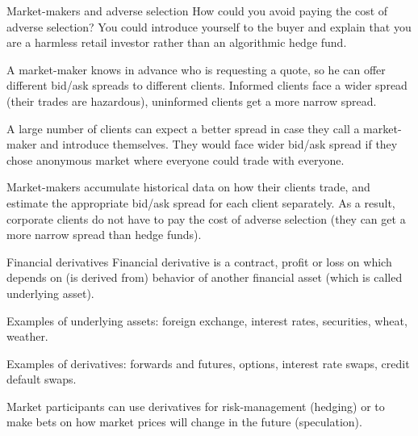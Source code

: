 \documentclass{beamer}
\begin{document}
\begin{frame}{Market-makers and adverse selection}
\justify
How could you avoid paying the cost of adverse selection? You could introduce yourself to the buyer and explain that you are a 
harmless retail investor rather than an algorithmic hedge fund.

\justify
A market-maker knows in advance \alert{who} is requesting a quote, so he can offer different bid/ask spreads to different clients.
Informed clients face a wider spread (their trades are hazardous), uninformed clients get a more narrow spread.

\justify
A large number of clients can expect a better spread in case they call a market-maker and introduce themselves. They would face wider bid/ask spread if they chose anonymous market where everyone could trade with everyone.

\justify
Market-makers accumulate historical data on how their clients trade, and estimate the appropriate bid/ask spread for each client separately. As a result, corporate clients do not have to pay the cost of adverse selection (they can get a more narrow spread than hedge funds).
\end{frame}



\begin{frame}{Financial derivatives}
\justify
\alert{Financial derivative} is a contract, profit or loss on which depends on (is derived from) behavior of another financial asset (which is called \alert{underlying} asset).

\justify
Examples of underlying assets: foreign exchange, interest rates, securities, wheat, weather.

\justify
Examples of derivatives: forwards and futures, options, interest rate swaps, credit default swaps.

\justify
Market participants can use derivatives for risk-management (hedging) or to make bets on how market prices will change in the future (speculation). 
\end{frame}
\end{document}
